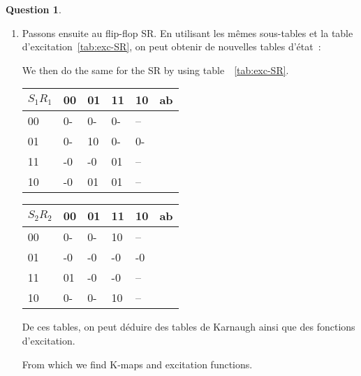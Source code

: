 \documentclass[11pt,a4paper,dvipsnames]{article}
\theoremstyle{definition}%
\newtheorem{Q}{Question}[] %
\newcommand{\fr}[1]{
 	\ifthenelse {\boolean{fr}} {#1} {}
 }
\newcommand{\en}[1]{
 	\ifthenelse {\boolean{en}} {#1} {}
 }
\begin{document}
\begin{Q}
{\begin{enumerate}
			\item \fr{Passons ensuite au flip-flop SR.
			En utilisant les mêmes sous-tables et la table d'excitation~\ref{tab:exc-SR}, on peut obtenir de nouvelles tables d'état~:}
			\en{We then do the same for the SR by using table~~\ref{tab:exc-SR}.}
			\begin{center}
				\begin{tabular}{|l|l|l|l|l|l} \hline
				$S_1R_1$ & 00         & 01         & 11         & 10         & \multicolumn{1}{l|}{ab} \\ \hline
				00           & 0- & 0- & 0- & -- & \\ \cline{1-5}
				01           & 0- & 10 & 0- & 0- & \\ \cline{1-5}
				11           & -0 & -0 & 01 & -- & \\ \cline{1-5}
				10           & -0 & 01 & 01 & -- & \\ \cline{1-5}
				\end{tabular}
				\begin{tabular}{|l|l|l|l|l|l} \hline
				$S_2R_2$ & 00         & 01         & 11         & 10         & \multicolumn{1}{l|}{ab} \\ \hline
				00           & 0- & 0- & 10 & -- & \\ \cline{1-5}
				01           & -0 & -0 & -0 & -0 & \\ \cline{1-5}
				11           & 01 & -0 & -0 & -- & \\ \cline{1-5}
				10           & 0- & 0- & 10 & -- & \\ \cline{1-5}
				\end{tabular}
			\end{center}

			\fr{De ces tables, on peut déduire des tables de Karnaugh ainsi que des fonctions d'excitation.}
			\en{From which we find K-maps and excitation functions.}
			\begin{center}



			\end{center}

		\end{enumerate}
	}

\end{Q}
\end{document}
